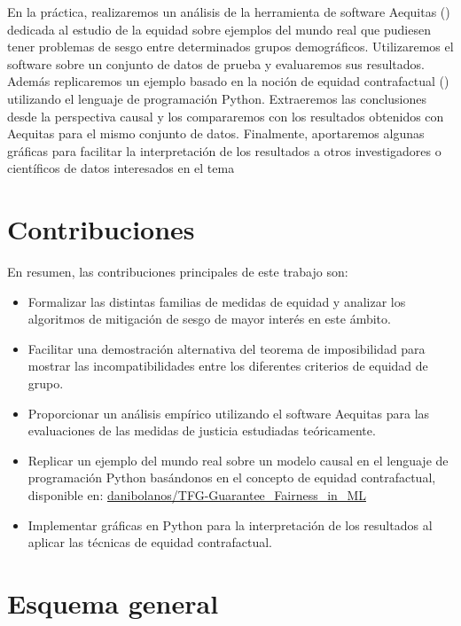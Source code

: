 \documentclass[oneside,openright,titlepage,numbers=noenddot,openany,headinclude,footinclude=true,
cleardoublepage=empty,abstractoff,BCOR=5mm,paper=a4,fontsize=12pt,main=spanish]{scrreprt}
\begin{document}
\clearpage

En la práctica, realizaremos un análisis de la herramienta de software Aequitas (\cite{aequitas2019}) dedicada al estudio de la equidad sobre ejemplos del mundo real que pudiesen tener problemas de sesgo entre determinados grupos demográficos. Utilizaremos el software sobre un conjunto de datos de prueba y evaluaremos sus resultados. Además replicaremos un ejemplo basado en la noción de equidad contrafactual (\cite{counterfactual2018}) utilizando el lenguaje de programación Python. Extraeremos las conclusiones desde la perspectiva causal y los compararemos con los resultados obtenidos con Aequitas para el mismo conjunto de datos. Finalmente, aportaremos algunas gráficas para facilitar la interpretación de los resultados a otros investigadores o científicos de datos interesados en el tema

\section{Contribuciones}

En resumen, las contribuciones principales de este trabajo son:

\begin{itemize}
    \item Formalizar las distintas familias de medidas de equidad y analizar los algoritmos de mitigación de sesgo de mayor interés en este ámbito.
    \item Facilitar una demostración alternativa del teorema de imposibilidad para mostrar las incompatibilidades entre los diferentes criterios de equidad de grupo.
    \item Proporcionar un análisis empírico utilizando el software Aequitas para las evaluaciones de las medidas de justicia estudiadas teóricamente.
    \item Replicar un ejemplo del mundo real sobre un modelo causal en el lenguaje de programación Python basándonos en el concepto de equidad contrafactual, disponible en: \href{https://github.com/danibolanos/TFG-Guarantee_Fairness_in_ML.git}{danibolanos/TFG-Guarantee\_Fairness\_in\_ML}
    \item Implementar gráficas en Python para la interpretación de los resultados al aplicar las técnicas de equidad contrafactual.
\end{itemize}

\section{Esquema general}
\end{document}
